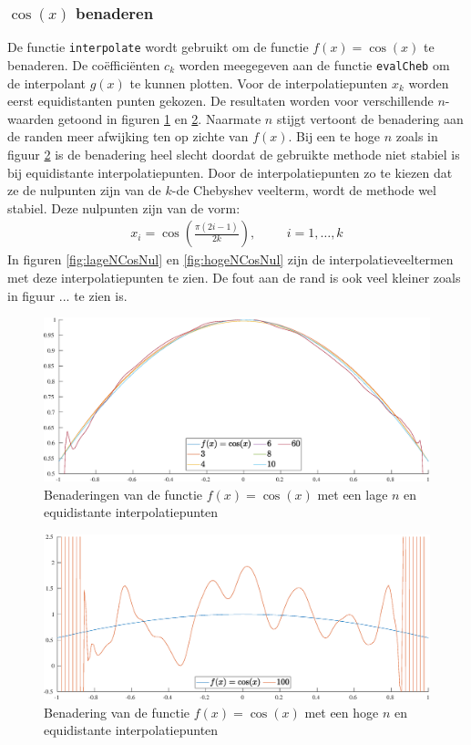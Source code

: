 \documentclass[a4paper, 12pt, titlepage, fleqn]{article}
\begin{document}
\subsubsection{$\cos(x)$ benaderen}
De functie \texttt{interpolate} wordt gebruikt om de functie $f(x) = \cos(x)$ te benaderen. De co\"effici\"enten $c_k$ worden meegegeven aan de functie \texttt{evalCheb} om de interpolant $g(x)$ te kunnen plotten. Voor de interpolatiepunten $x_k$ worden eerst equidistanten punten gekozen. De resultaten worden voor verschillende $n$-waarden getoond in figuren \ref{lageNCosEqui} en \ref{fig:hogeNCosEqui}. Naarmate $n$ stijgt vertoont de benadering aan de randen meer afwijking ten op zichte van $f(x)$. Bij een te hoge $n$ zoals in figuur \ref{fig:hogeNCosEqui} is de benadering heel slecht doordat de gebruikte methode niet stabiel is bij equidistante interpolatiepunten. Door de interpolatiepunten zo te kiezen dat ze de nulpunten zijn van de $k$-de Chebyshev veelterm, wordt de methode wel stabiel. Deze nulpunten zijn van de vorm:
\begin{align*}
x_i = \cos\left(\frac{\pi(2i-1)}{2k}\right), \hspace{1cm} i = 1,\ldots,k
\end{align*}
In figuren \ref{fig:lageNCosNul} en \ref{fig:hogeNCosNul} zijn de interpolatieveeltermen met deze interpolatiepunten te zien. De fout aan de rand is ook veel kleiner zoals in figuur ... te zien is.


\begin{figure}
\centering
\includegraphics[width=\textwidth]{../Afbeeldingen/cos_equi_laag.eps}
\caption{Benaderingen van de functie $f(x) = \cos(x)$ met een lage $n$ en equidistante interpolatiepunten}
\label{lageNCosEqui}
\end{figure}

\begin{figure}
\centering
\includegraphics[width=\textwidth]{../Afbeeldingen/cos_equi_hoog.eps}
\caption{Benadering van de functie $f(x) = \cos(x)$ met een hoge $n$ en equidistante interpolatiepunten}
\label{fig:hogeNCosEqui}
\end{figure}
\end{document}
